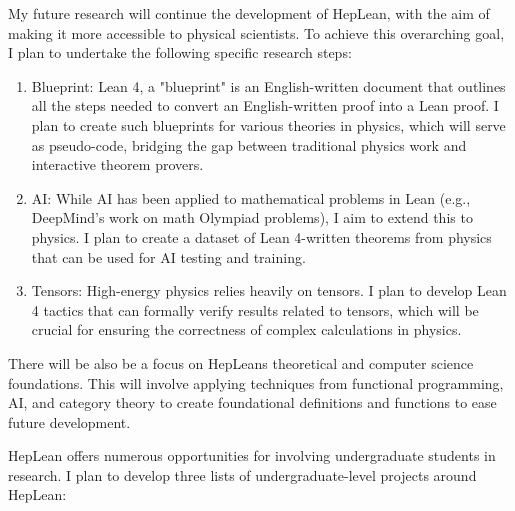 \documentclass[12pt,letter]{article}
\newcounter{customtitle}
\begin{document}
My future research will continue the development of HepLean, with the aim of making it more accessible to physical scientists.  
To achieve this overarching goal, I plan to undertake the following specific research steps:
\begin{enumerate}
\item Blueprint:  Lean 4, a "blueprint" is an English-written document that outlines all the steps needed to convert an English-written proof into a Lean proof. I plan to create such blueprints for various theories in physics, which will serve as pseudo-code, bridging the gap between traditional physics work and interactive theorem provers.
\item AI: While AI has been applied to mathematical problems in Lean (e.g., DeepMind's work on math Olympiad problems), I aim to extend this to physics. I plan to create a dataset of Lean 4-written theorems from physics that can be used for AI testing and training.
\item Tensors: High-energy physics relies heavily on tensors. I plan to develop Lean 4 tactics that can formally verify results related to tensors, which will be crucial for ensuring the correctness of complex calculations in physics.
\end{enumerate}

There will be also be a focus on HepLeans theoretical and computer science foundations. This will involve applying techniques from functional programming, AI, and category theory to create foundational definitions and functions to ease future development.


HepLean offers numerous opportunities for involving undergraduate students in research. I plan to develop three lists of undergraduate-level projects around HepLean:
\end{document}
